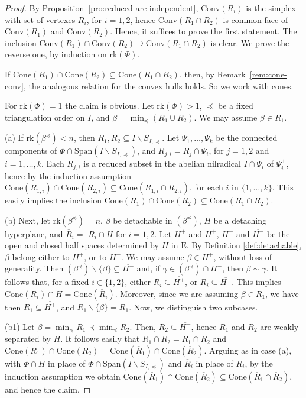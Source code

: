 \documentclass[10pt]{amsart}
\theoremstyle{definition}
\theoremstyle{remark}
\newcommand\nl{\par\noindent}
\newcommand\ov{\overline}
\newcommand\smeno{\smallsetminus}
\newcommand\conv{\mathrm{Conv}}
\newcommand\cone{\mathrm{Cone}}
\newcommand\gen{\mathrm{Span}}
\newcommand\rk{\mathrm{rk}}
\newcommand\be{\beta}
\newcommand\ga{\gamma}
\newcommand\preq{\preccurlyeq}
\begin{document}
\begin{proof}
By Proposition~\ref{pro:reduced-are-independent}, $\conv(R_i)$ is the simplex with set of vertexes $R_i$, for $i=1,2$, hence  $\conv(R_1\cap R_2)$ is common face of  $\conv(R_1)$ and $\conv(R_2)$. 
Hence, it suffices to prove the first statement.
The inclusion $\conv(R_1)\cap\conv(R_2)\supseteq \conv(R_1\cap R_2)$ is clear. 
We prove the reverse one, by induction on $\rk(\Phi)$. 

\par
If $\cone(R_1)\cap\cone(R_2)\subseteq \cone(R_1\cap R_2)$, then, by Remark~\ref{rem:cone-conv}, the analogous relation for the convex hulls holds. 
So we work with cones.

\par
For $\rk(\Phi)=1$ the claim is obvious. 
Let  $\rk(\Phi)>1$, $\preq$ be a fixed triangulation order on $I$,  and $\be=\min_\preq(R_1\cup R_2)$. 
We may assume $\be\in R_1$.

\par
 (a) If $\rk(\be^\preq)< n$, then $R_1, R_2\subseteq I\smeno S_{I, \preq}$. 
Let $\Psi_1, \dots, \Psi_k$ be the connected components of $\Phi\cap \gen(I\smeno S_{I, \preq})$,
and $R_{j,i}=R_j\cap \Psi_i$, for $j=1,2$ and $i=1, \dots, k$. 
Each $R_{j,i}$ is a reduced subset in the abelian nilradical $I\cap \Psi_i$ of $\Psi_i^+$, hence by the induction assumption $\cone(R_{1,i})\cap\cone(R_{2,i})\subseteq \cone(R_{1,i}\cap R_{2,i})$, 
for each $i$ in $\{1,\dots,k\}$. 
This easily implies the inclusion $\cone(R_1)\cap\cone(R_2)\subseteq \cone(R_1\cap R_2)$. 

(b) Next, let  $\rk(\be^\preq)=n$,  $\be$ be detachable in  $(\be^\preq)$, $H$ be a detaching hyperplane, and $\ov R_i=$ $R_i\cap H$ for $i=1,2$.
Let $H^+$ and $\ov{H^+}$,  $H^-$ and $\ov{H^-}$ be the open and closed half spaces determined by $H$ in $\mathrm E$. 
By Definition \ref{def:detachable}, $\be$ belong either to $H^+$, or to $H^-$. 
We may assume $\be\in H^+$, without loss of generality. 
Then $(\be^\preq)\smeno\{\be\}\subseteq \ov{H^-}$ and, if $\ga\in(\be^\preq)\cap H^-$, then $\be\sim \ga$. 
It follows that, for a fixed $i\in \{1, 2\}$, either $R_i\subseteq \ov{H^+}$,  or $R_i\subseteq \ov{H^-}$.
This implies  $\cone(R_i)\cap H=\cone(\ov R_i)$. 
Moreover, since we are assuming $\be\in R_1$, we have 
then $R_1\subseteq \ov{H^+}$, and $R_1\smeno\{\be\}=\ov R_1$.
Now, we distinguish two subcases.

(b1) Let $\be=\min_\preq R_1\prec \min_\preq R_{2}$.
Then,  $R_2\subseteq \ov {H^-}$, hence $R_1$ and $R_2$ are weakly separated by $H$. 
It follows easily that  $R_1\cap R_2=\ov R_1\cap \ov R_2$ and $\cone(R_1)\cap\cone(R_2)=\cone(\ov R_1)\cap\cone(\ov R_2)$. 
Arguing as in case (a), with $\Phi\cap H$ in place of  $\Phi\cap \gen(I\smeno S_{I, \preq})$ and $\ov R_i$ in place of $R_i$, by the induction assumption we obtain $\cone(\ov R_1)\cap\cone(\ov R_2)\subseteq\cone (\ov R_1\cap \ov R_2)$, 
and hence the claim.


\end{proof}
\end{document}
